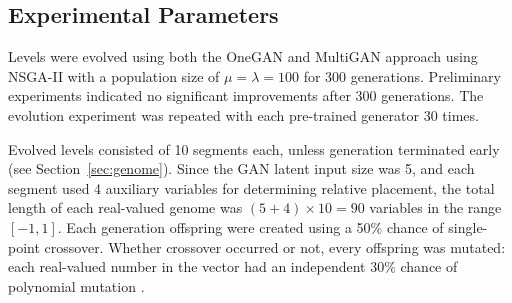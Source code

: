 

\subsection{Experimental Parameters}

Levels were evolved using both the OneGAN and MultiGAN approach using NSGA-II with a population size of $\mu = \lambda = 100$ for 300 generations. Preliminary experiments indicated no significant improvements after 300 generations. The evolution experiment was repeated with each pre-trained generator 30 times. 

Evolved levels consisted of 10 segments each, unless generation terminated early (see Section~\ref{sec:genome}). Since the GAN latent input size was 5, and each segment used 4 auxiliary variables for determining relative placement, the total length of each real-valued genome was $(5+4)\times 10 = 90$ variables in the range $[-1,1]$. Each generation offspring were created using a 50\% chance of single-point crossover. Whether crossover occurred or not, every offspring was mutated: each real-valued number in the vector
had an independent 30\% chance of polynomial mutation \cite{deb1:cs95:polynomial}.

